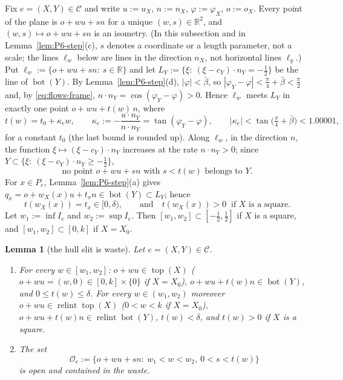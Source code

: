 \documentclass[11pt]{amsart}
\newcommand{\R}{\mathbb R}
\newcommand{\relint}{\operatorname{relint}}
\newcommand{\Bot}{\operatorname{bot}}
\newcommand{\Top}{\operatorname{top}}
\newcommand{\bbar}{\bar\beta}
\newtheorem{lemma}[theorem]{Lemma}
\theoremstyle{definition}
\theoremstyle{remark}
\numberwithin{equation}{section}
\begin{document}
Fix $e=(X,Y)\in\mathcal C$ and write $u:=u_X$, $n:=n_X$, $\varphi:=\varphi_X$, $o:=o_X$. Every point of the plane is
$o+wu+sn$ for a unique $(w,s)\in\R^2$, and $(w,s)\mapsto o+wu+sn$ is an isometry. (In this subsection and in Lemma~\ref{lem:P6-step}(c), $s$ denotes a coordinate or a length
parameter, not a scale; the lines $\ell_w$ below are lines in the direction $n_X$, not horizontal lines $\ell_y$.) Put $\ell_w:=\{o+wu+sn:\ s\in\R\}$
and let $L_Y:=\{\xi:\ (\xi-c_Y)\cdot n_Y=-\frac12\}$ be the line of $\Bot(Y)$. By Lemma~\ref{lem:P6-step}(d),
$|\varphi|<\bbar$, so $|\varphi_Y-\varphi|<\frac\pi4+\bbar<\frac\pi2$ and, by \eqref{eq:flows-frame},
$n\cdot n_Y=\cos(\varphi_Y-\varphi)>0$. Hence $\ell_w$ meets $L_Y$ in exactly one point $o+wu+t(w)\,n$, where
\begin{equation}\label{eq:P6-t}
t(w)=t_0+\kappa_e w,\qquad \kappa_e:=-\frac{u\cdot n_Y}{n\cdot n_Y}=\tan(\varphi_Y-\varphi),\qquad
|\kappa_e|<\tan\big(\tfrac\pi4+\bbar\big)<1.00001,
\end{equation}
for a constant $t_0$ (the last bound is rounded up). Along $\ell_w$, in the direction $n$, the function
$\xi\mapsto(\xi-c_Y)\cdot n_Y$ increases at the rate $n\cdot n_Y>0$; since
$Y\subset\{\xi:\ (\xi-c_Y)\cdot n_Y\ge-\frac12\}$,
\begin{equation}\label{eq:P6-belowY}
\text{no point $o+wu+sn$ with $s<t(w)$ belongs to $Y$.}
\end{equation}
For $x\in P_e$, Lemma~\ref{lem:P6-step}(a) gives $q_x=o+w_X(x)u+t_xn\in\Bot(Y)\subset L_Y$; hence
\begin{equation}\label{eq:P6-tx}
t(w_X(x))=t_x\in[0,\delta),\qquad\text{and}\quad t(w_X(x))>0\ \text{ if $X$ is a square.}
\end{equation}
Let $w_1:=\inf I_e$ and $w_2:=\sup I_e$. Then $[w_1,w_2]\subset[-\frac12,\frac12]$ if $X$ is a square, and
$[w_1,w_2]\subset[0,k]$ if $X=X_0$.

\begin{lemma}[the hull slit is waste]\label{lem:P6-hull}
Let $e=(X,Y)\in\mathcal C$.
\begin{enumerate}[label=(\roman*)]
\item For every $w\in[w_1,w_2]$: $o+wu\in\Top(X)$ \textup{(}$o+wu=(w,0)\in[0,k]\times\{0\}$ if $X=X_0$\textup{)},
$o+wu+t(w)n\in\Bot(Y)$, and $0\le t(w)\le\delta$. For every $w\in(w_1,w_2)$ moreover $o+wu\in\relint\Top(X)$
\textup{(}$0<w<k$ if $X=X_0$\textup{)}, $o+wu+t(w)n\in\relint\Bot(Y)$, $t(w)<\delta$, and $t(w)>0$ if $X$ is a square.
\item The set
\[
\mathcal O_e:=\{o+wu+sn:\ w_1<w<w_2,\ 0<s<t(w)\}
\]
is open and contained in the waste.
\end{enumerate}
\end{lemma}
\end{document}

